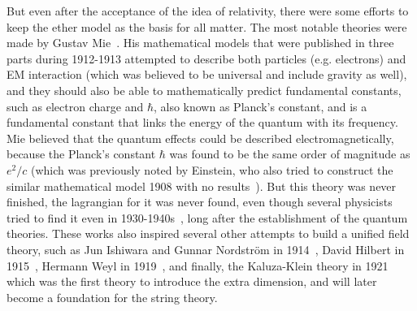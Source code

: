 But even after the acceptance of the idea of relativity, there were some efforts to keep the ether model as the basis for all matter. The most notable theories were made by Gustav Mie~\cite{lib:theory_mie1, lib:theory_mie2, lib:theory_mie3}. His mathematical models that were published in three parts during 1912-1913 attempted to describe both particles (e.g. electrons) and EM interaction (which was believed to be universal and include gravity as well), and they should also be able to mathematically predict fundamental constants, such as electron charge and $\hbar$, also known as Planck's constant, and is a fundamental constant that links the energy of the quantum with its frequency. Mie believed that the quantum effects could be described electromagnetically, because the Planck's constant $\hbar$ was found to be the same order of magnitude as $e^{2}/c$ (which was previously noted by Einstein, who also tried to construct the similar mathematical model 1908 with no results~\cite{lib:theory_e_sc_c}). But this theory was never finished, the lagrangian for it was never found, even though several physicists tried to find it even in 1930-1940s~\cite{lib:theory_mie_last}, long after the establishment of the quantum theories. These works also inspired several other attempts to build a unified field theory, such as Jun Ishiwara and Gunnar Nordstr{\"o}m in 1914~\cite{lib:theory_ishiwara_mie, lib:theory_nordstrom_mie}, David Hilbert in 1915~\cite{lib:theory_hilbert_mie1, lib:theory_hilbert_mie2}, Hermann Weyl in 1919~\cite{lib:theory_weyl_mie}, and finally, the Kaluza-Klein theory in 1921~\cite{lib:theory_kaluza_mie} which was the first theory to introduce the extra dimension, and will later become a foundation for the string theory.

